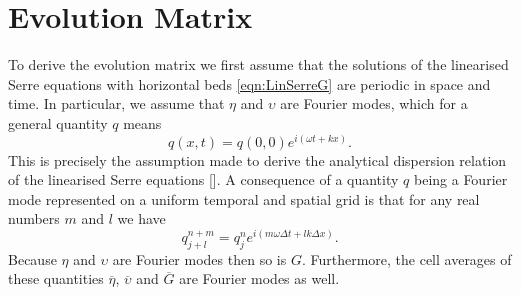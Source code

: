 \section{Evolution Matrix}
To derive the evolution matrix we first assume that the solutions of the linearised Serre equations with horizontal beds \eqref{eqn:LinSerreG} are periodic in space and time. In particular, we assume that $\eta$ and $\upsilon$ are Fourier modes, which for a general quantity $q$ means
\begin{equation}
q(x,t) = q(0,0) e^{i\left(\omega t + kx\right)}.
\label{eqn:FourierNode}
\end{equation}
This is precisely the assumption made to derive the analytical dispersion relation of the linearised Serre equations []. A consequence of a quantity $q$ being a Fourier mode represented on a uniform temporal and spatial grid is that for any real numbers $m$ and $l$ we have
\begin{equation}
q^{n + m}_{j + l} = q^n_j e^{ i \left(m \omega \Delta t + l k \Delta x\right)}.
\label{eqn:fourierfactor}
\end{equation}
Because $\eta$ and $\upsilon$ are Fourier modes then so is $G$. Furthermore, the cell averages of these quantities $\overline{\eta}$, $\overline{\upsilon}$ and $\overline{G}$ are Fourier modes as well.

